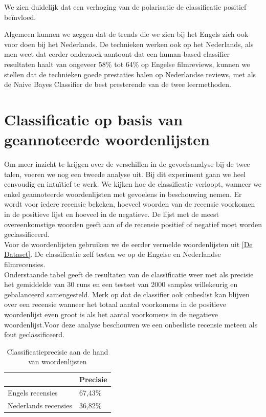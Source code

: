  We zien duidelijk dat een verhoging van de polarisatie de classificatie positief be\"invloed.

Algemeen kunnen we zeggen dat de trends die we zien bij het Engels zich ook voor doen bij het Nederlands. De technieken werken ook op het Nederlands, als men weet dat eerder onderzoek \cite{pang2002thumbs} aantoont dat een human-based classifier resultaten haalt van ongeveer 58\% tot 64\% op Engelse filmreviews, kunnen we stellen dat de technieken goede prestaties halen op Nederlandse reviews, met als de Naive Bayes Classifier de best presterende van de twee leermethoden.


\section{Classificatie op basis van geannoteerde woordenlijsten}\label{Classificatie op basis van geannoteerde woordenlijsten}

Om meer inzicht te krijgen over de verschillen in de gevoelsanalyse bij de twee talen, voeren we nog een tweede analyse uit. Bij dit experiment gaan we heel eenvoudig en intu\"itief te werk. We kijken hoe de classificatie verloopt, wanneer we enkel geannoteerde woordenlijsten met gevoelens in beschouwing nemen. Er wordt voor iedere recensie bekeken, hoeveel woorden van de recensie voorkomen in de positieve lijst en hoeveel in de negatieve. De lijst met de meest overeenkomstige woorden geeft aan of de recensie positief of negatief moet worden geclassificeerd.\\
Voor de woordenlijsten gebruiken we de eerder vermelde woordenlijsten uit \ref{De Dataset}. De classificatie zelf testen we op de Engelse en Nederlandse filmrecensies.\\
Onderstaande tabel geeft de resultaten van de classificatie weer met als precisie het gemiddelde van 30 runs en een testset van 2000 samples willekeurig en gebalanceerd samengesteld. Merk op dat de classifier ook onbeslist kan blijven over een recensie wanneer het totaal aantal voorkomens in de positieve woordenlijst even groot is als het aantal voorkomens in de negatieve woordenlijst.Voor deze analyse beschouwen we een onbesliste recensie meteen als fout geclassificeerd.

\begin{table}[H]
\centering
\begin{tabular}{l|l|}
\cline{2-2}
                                           & Precisie \\ \hline
\multicolumn{1}{|l|}{Engels recensies}     & 67,43\%  \\ \hline
\multicolumn{1}{|l|}{Nederlands recensies} & 36,82\%   \\ \hline
\end{tabular}
\caption{Classificatieprecisie aan de hand van woordenlijsten}
\end{table}

